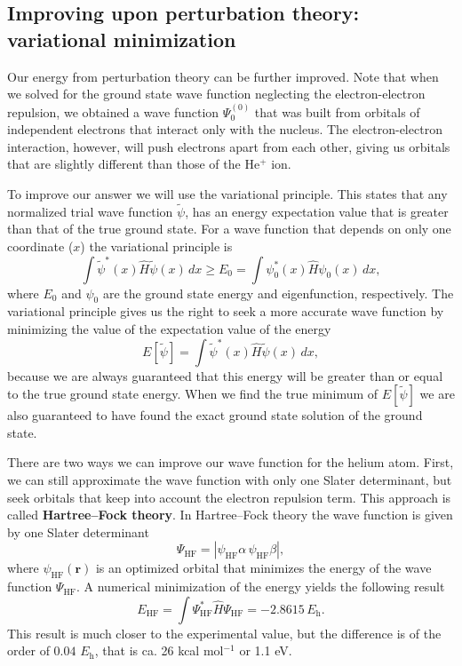 \documentclass[../Main/chem331-notes.tex]{subfiles}
\begin{document}
\subsection{Improving upon perturbation theory: variational minimization}
Our energy from perturbation theory can be further improved. 
Note that when we solved for the ground state wave function neglecting the electron-electron repulsion, we obtained a wave function $\Psi_0^{(0)}$ that was built from orbitals of independent electrons that interact only with the nucleus.
The electron-electron interaction, however, will push electrons apart from each other, giving us orbitals that are slightly different than those of the He$^+$ ion.

To improve our answer we will use the variational principle. This states that any normalized trial wave function $\tilde{\psi}$, has an energy expectation value that is greater than that of the true ground state. For a wave function that depends on only one coordinate ($x$) the variational principle is
\begin{equation}
\int \tilde{\psi}^*(x) \hat{H} \tilde{\psi}(x) \, dx \geq E_0 = \int \psi_0^*(x) \hat{H} \psi_0(x) \, dx,
\end{equation}
where $E_0$ and $\psi_0$ are the ground state energy and eigenfunction, respectively.
The variational principle gives us the right to seek a more accurate wave function by minimizing the value of the expectation value of the energy
\begin{equation}
E[\tilde{\psi}] = \int \tilde{\psi}^*(x) \hat{H} \tilde{\psi}(x) \, dx,
\end{equation}
because we are always guaranteed that this energy will be greater than or equal to the true ground state energy.
When we find the true minimum of $E[\tilde{\psi}]$ we are also guaranteed to have found the exact ground state solution of the ground state.

There are two ways we can improve our wave function for the helium atom.
First, we can still approximate the wave function with only one Slater determinant, but seek orbitals that keep into account the electron repulsion term.
This approach is called \textbf{Hartree--Fock theory}.
In Hartree--Fock theory the wave function is given by one Slater determinant
\begin{equation}
\Psi_\mathrm{HF} = |\psi_\mathrm{HF} \alpha \, \psi_\mathrm{HF} \beta|,
\end{equation}
where $\psi_\mathrm{HF}(\mathbf{r})$ is an optimized orbital that minimizes the energy of the wave function $\Psi_\mathrm{HF}$.
A numerical minimization of the energy yields the following result
\begin{equation}
E_\mathrm{HF} = \int \Psi^*_\mathrm{HF} \hat{H} \Psi_\mathrm{HF} = -2.8615 \, E_\mathrm{h}.
\end{equation}
This result is much closer to the experimental value, but the difference is of the order of $0.04$ $E_\mathrm{h}$, that is ca. 26 kcal mol$^{-1}$ or 1.1 eV.
\end{document}
